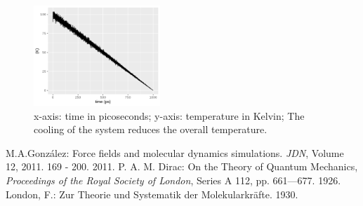 \documentclass[10pt, a4paper, oneside, twocolumn]{article}
\begin{document}
\begin{figure}[t]
    \centering
    \includegraphics[width=180px]{plots//freezing/freezing_temp.png}
    \caption{x-axis: time in picoseconds; y-axis: temperature in Kelvin; The cooling of the system reduces the overall temperature.}
    \label{freezing_temp}
\end{figure}


\begin{thebibliography}{100}
 M.A.González: Force fields and molecular dynamics simulations. \textit{JDN}, Volume 12, 2011. 169 - 200. 2011.
 P. A. M. Dirac: On the Theory of Quantum Mechanics, \textit{Proceedings of the Royal Society of London}, Series A 112, pp. 661—677. 1926.
 London, F.: Zur Theorie und Systematik der Molekularkräfte. 1930.
\end{thebibliography}
\end{document}
